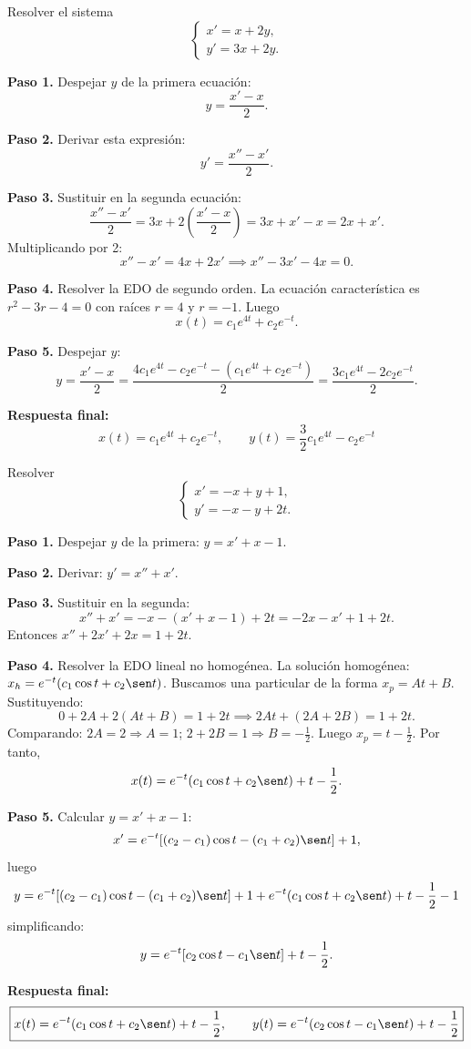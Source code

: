 \begin{example}
Resolver el sistema
\[
\begin{cases}
x' = x + 2y,\\
y' = 3x + 2y.
\end{cases}
\]
\begin{myproof}
\textbf{Paso 1.} Despejar $y$ de la primera ecuación:
\[
y=\frac{x'-x}{2}.
\]

\textbf{Paso 2.} Derivar esta expresión:
\[
y'=\frac{x''-x'}{2}.
\]

\textbf{Paso 3.} Sustituir en la segunda ecuación:
\[
\frac{x''-x'}{2}=3x+2\left(\frac{x'-x}{2}\right)=3x+x'-x=2x+x'.
\]
Multiplicando por 2:
\[
x''-x'=4x+2x' \implies x''-3x'-4x=0.
\]

\textbf{Paso 4.} Resolver la EDO de segundo orden. La ecuación característica es $r^2-3r-4=0$ con raíces $r=4$ y $r=-1$. Luego
\[
x(t)=c_1 e^{4t}+c_2 e^{-t}.
\]

\textbf{Paso 5.} Despejar $y$:
\[
y=\frac{x'-x}{2}
=\frac{4c_1 e^{4t}-c_2 e^{-t} - (c_1 e^{4t}+c_2 e^{-t})}{2}
=\frac{3c_1 e^{4t}-2c_2 e^{-t}}{2}.
\]

\textbf{Respuesta final:}
\[
\boxed{
x(t)=c_1 e^{4t}+c_2 e^{-t},\qquad
y(t)=\frac{3}{2}c_1 e^{4t}-c_2 e^{-t}
}
\]
\end{myproof}
\end{example}

\begin{example}
Resolver
\[
\begin{cases}
x' = -x + y + 1,\\
y' = -x - y + 2t.
\end{cases}
\]
\begin{myproof}
\textbf{Paso 1.} Despejar $y$ de la primera: $y=x'+x-1$.

\textbf{Paso 2.} Derivar: $y'=x''+x'$.

\textbf{Paso 3.} Sustituir en la segunda:
\[
x''+x'=-x-(x'+x-1)+2t=-2x-x'+1+2t.
\]
Entonces $x''+2x'+2x=1+2t$.

\textbf{Paso 4.} Resolver la EDO lineal no homogénea. La solución homogénea: $x_h=e^{-t}(c_1\cos t+c_2\sen t)$. Buscamos una particular de la forma $x_p=At+B$. Sustituyendo:
\[
0+2A+2(At+B)=1+2t \implies 2At+(2A+2B)=1+2t.
\]
Comparando: $2A=2\Rightarrow A=1$; $2+2B=1\Rightarrow B=-\frac12$. Luego $x_p=t-\frac12$.
Por tanto,
\[
x(t)=e^{-t}(c_1\cos t+c_2\sen t)+t-\frac12.
\]

\textbf{Paso 5.} Calcular $y=x'+x-1$:
\[
x'=e^{-t}[(c_2-c_1)\cos t-(c_1+c_2)\sen t]+1,
\]
luego
\[
y= e^{-t}[(c_2-c_1)\cos t-(c_1+c_2)\sen t]+1 + e^{-t}(c_1\cos t+c_2\sen t)+t-\frac12 -1
\]
simplificando:
\[
y=e^{-t}[c_2\cos t-c_1\sen t]+t-\frac12.
\]

\textbf{Respuesta final:}
\[
\boxed{
x(t)=e^{-t}(c_1\cos t+c_2\sen t)+t-\frac12,\qquad
y(t)=e^{-t}(c_2\cos t-c_1\sen t)+t-\frac12
}
\]
\end{myproof}
\end{example}


